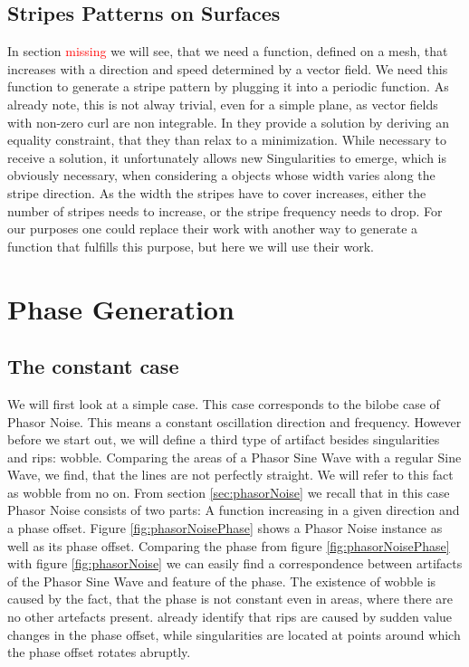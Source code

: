\documentclass{utue} %
\begin{document}
\subsection{Stripes Patterns on Surfaces}
In section \textcolor{red}{missing} we will see, that we need a function, defined on a mesh, that increases with a direction and speed determined by a vector field. We need this function to generate a stripe pattern by plugging it into a periodic function. As \citeauthor{stripes} already note, this is not alway trivial, even for a simple plane, as vector fields with non-zero curl are non integrable. In \cite{stripes} they provide a solution by deriving an equality constraint, that they than relax to a minimization. While necessary to receive a solution, it unfortunately allows new Singularities to emerge, which is obviously necessary, when considering a objects whose width varies along the stripe direction. As the width the stripes have to cover increases, either the number of stripes needs to increase, or the stripe frequency needs to drop. For our purposes one could replace their work with another way to generate a function that fulfills this purpose, but here we will use their work.

\section{Phase Generation}
\subsection{The constant case}
We will first look at a simple case. This case corresponds to the bilobe case of Phasor Noise. This means a constant oscillation direction and frequency. However before we start out, we will define a third type of artifact besides singularities and rips: wobble. Comparing the areas of a Phasor Sine Wave with a regular Sine Wave, we find, that the lines are not perfectly straight. We will refer to this fact as wobble from no on. From section \ref{sec:phasorNoise} we recall that in this case Phasor Noise consists of two parts: A function increasing in a given direction and a phase offset. Figure \ref{fig:phasorNoisePhase} shows a Phasor Noise instance as well as its phase offset. Comparing the phase from figure \ref{fig:phasorNoisePhase} with figure \ref{fig:phasorNoise} we can easily find a correspondence between artifacts of the Phasor Sine Wave and feature of the phase. The existence of wobble is caused by the fact, that the phase is not constant even in areas, where there are no other artefacts present. \citeauthor{phasorNoise} already identify that rips are caused by sudden value changes in the phase offset, while singularities are located at points around which the phase offset rotates abruptly.\\
\end{document}
